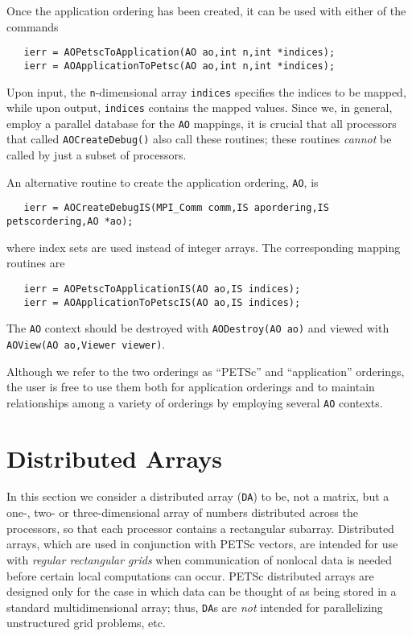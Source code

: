 Once the application ordering has been created, it can be used
with either of the commands
\begin{verbatim}
   ierr = AOPetscToApplication(AO ao,int n,int *indices);
   ierr = AOApplicationToPetsc(AO ao,int n,int *indices);
\end{verbatim}
Upon input, the {\tt n}-dimensional array {\tt indices} specifies 
the indices to be mapped, while upon output, {\tt indices} contains
the mapped values.
 
Since we, in general, employ a parallel database for the
{\tt AO} mappings, it is crucial that all processors that
called {\tt AOCreateDebug()} also call these routines; these
routines {\em cannot} be called by just a subset of processors.

An alternative routine to create the application ordering, {\tt AO}, is 
\begin{verbatim}
   ierr = AOCreateDebugIS(MPI_Comm comm,IS apordering,IS petscordering,AO *ao);
\end{verbatim}
where index sets are used instead of integer arrays.  The corresponding
mapping routines are
\begin{verbatim}
   ierr = AOPetscToApplicationIS(AO ao,IS indices);
   ierr = AOApplicationToPetscIS(AO ao,IS indices);
\end{verbatim}
 

  
The {\tt AO} context should be destroyed with {\tt AODestroy(AO ao)}
and viewed with {\tt AOView(AO ao,Viewer viewer)}.

Although we refer to the two orderings as ``PETSc'' and
``application'' orderings, the user is free to use them both for
application orderings and to maintain relationships among a variety of
orderings by employing several {\tt AO} contexts.

\section{Distributed Arrays}
\label{sec:da}

In this section we consider a distributed array ({\tt DA}) to be,
not a matrix, but a one-, two- or three-dimensional array of numbers
distributed across the processors, so that each processor contains a
rectangular subarray.  Distributed arrays, which are used in
conjunction with PETSc vectors, are intended for use with {\em
regular rectangular grids} when communication of nonlocal data is
needed before certain local computations can occur.  PETSc distributed
arrays are designed only for the case in which data can be thought of
as being stored in a standard multidimensional array; thus, {\tt DA}s 
are {\em not} intended for parallelizing unstructured grid problems, etc.


